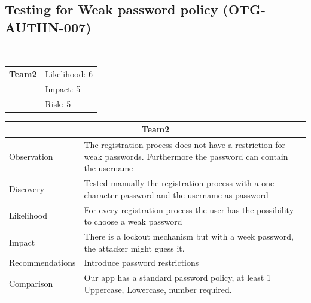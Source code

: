 \documentclass[headsepline,footsepline,footinclude=false,oneside,fontsize=11pt,paper=a4,listof=totoc,bibliography=totoc]{scrbook} %
\begin{document}
\pagebreak
\subsection{Testing for Weak password policy (OTG-AUTHN-007)}\

\begin{tabular}{cR{12cm}}
	\textbf{Team2} & Likelihood: 6\\& Impact: 5\\& Risk: 5
\end{tabular}

\begin{tabular}{ l|p{11cm}  }
	\hline
	\multicolumn{2}{c}{\textbf{Team2}} \\
	\hline
	Observation & The registration process does not have a restriction for weak passwords. Furthermore the password can contain the username\\
	Discovery & Tested manually the registration process with a one character password and the username as password\\
	Likelihood & For every registration process the user has the possibility to choose a weak password\\
	Impact & There is a lockout mechanism but with a week password, the attacker might guess it.\\
	Recommendations & Introduce password restrictions\\
	Comparison & Our app has a standard password policy, at least 1 Uppercase, Lowercase, number required. \\
	\hline
\end{tabular}
\\
\vspace{0.5cm}
\\
\end{document}
